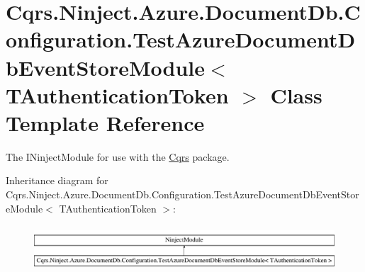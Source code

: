 \hypertarget{classCqrs_1_1Ninject_1_1Azure_1_1DocumentDb_1_1Configuration_1_1TestAzureDocumentDbEventStoreModule}{}\section{Cqrs.\+Ninject.\+Azure.\+Document\+Db.\+Configuration.\+Test\+Azure\+Document\+Db\+Event\+Store\+Module$<$ T\+Authentication\+Token $>$ Class Template Reference}
\label{classCqrs_1_1Ninject_1_1Azure_1_1DocumentDb_1_1Configuration_1_1TestAzureDocumentDbEventStoreModule}


The I\+Ninject\+Module for use with the \hyperlink{namespaceCqrs}{Cqrs} package.  


Inheritance diagram for Cqrs.\+Ninject.\+Azure.\+Document\+Db.\+Configuration.\+Test\+Azure\+Document\+Db\+Event\+Store\+Module$<$ T\+Authentication\+Token $>$\+:\begin{figure}[H]
\begin{center}
\leavevmode
\includegraphics[height=1.684211cm]{classCqrs_1_1Ninject_1_1Azure_1_1DocumentDb_1_1Configuration_1_1TestAzureDocumentDbEventStoreModule}
\end{center}
\end{figure}
